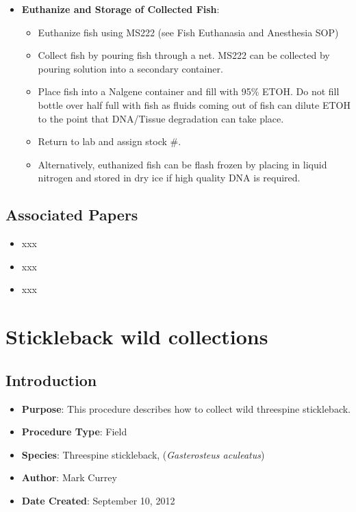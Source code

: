 \documentclass[
  letterpaper,
  DIV=11,
  numbers=noendperiod]{scrreprt}
\providecommand{\tightlist}{%
  \setlength{\itemsep}{0pt}\setlength{\parskip}{0pt}}\usepackage{longtable,booktabs,array}
\begin{document}
\begin{itemize}
\tightlist
\item
  \textbf{Euthanize and Storage of Collected Fish}:

  \begin{itemize}
  \tightlist
  \item
    Euthanize fish using MS222 (see Fish Euthanasia and Anesthesia SOP)
  \item
    Collect fish by pouring fish through a net. MS222 can be collected
    by pouring solution into a secondary container.
  \item
    Place fish into a Nalgene container and fill with 95\% ETOH. Do not
    fill bottle over half full with fish as fluids coming out of fish
    can dilute ETOH to the point that DNA/Tissue degradation can take
    place.
  \item
    Return to lab and assign stock \#.
  \item
    Alternatively, euthanized fish can be flash frozen by placing in
    liquid nitrogen and stored in dry ice if high quality DNA is
    required.
  \end{itemize}
\end{itemize}

\hypertarget{associated-papers-26}{%
\section{Associated Papers}\label{associated-papers-26}}

\begin{itemize}
\tightlist
\item
  xxx
\item
  xxx
\item
  xxx
\end{itemize}

\hypertarget{sec-vert_exp-stickleback_collections}{%
\chapter{Stickleback wild
collections}\label{sec-vert_exp-stickleback_collections}}

\hypertarget{introduction-44}{%
\section{Introduction}\label{introduction-44}}

\begin{itemize}
\tightlist
\item
  \textbf{Purpose}: This procedure describes how to collect wild
  threespine stickleback.
\item
  \textbf{Procedure Type}: Field
\item
  \textbf{Species}: Threespine stickleback, (\emph{Gasterosteus
  aculeatus})
\item
  \textbf{Author}: Mark Currey
\item
  \textbf{Date Created}: September 10, 2012
\end{itemize}
\end{document}
